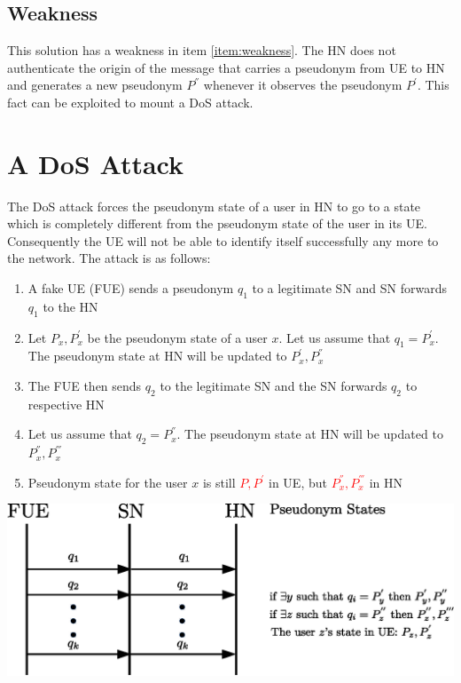 \documentclass[portrait,a0]{a0poster}
\begin{document}
\begin{multicols}{2}
\subsection*{Weakness}This solution has a weakness in item \ref{item:weakness}. The HN does not authenticate the origin of the message that carries a pseudonym from UE to HN and generates a new pseudonym $P^{''}$ whenever it observes the pseudonym $P^{'}$. This fact can be exploited to mount a DoS attack.

\section{A D\MakeLowercase{o}S Attack}
The DoS attack forces the pseudonym state of a user in HN to go to a state which is completely different from the pseudonym state of the user in its UE. Consequently the UE will not be able to identify itself successfully any more to the network. The attack is as follows:
\begin{enumerate}
\item \label{send_fake_pseudonym} A fake UE (FUE) sends a pseudonym $q_1$ to a legitimate SN and SN forwards $q_1$ to the HN
\item \label{q_equal_pseudonym} Let $P_x,P_x^{'}$ be the pseudonym state of a user $x$. Let us assume that $q_1=P_x^{'}$. The pseudonym state at HN will be updated to $P_x^{'},P_x^{''}$
\item The FUE then sends $q_2$ to the legitimate SN and the SN forwards $q_2$ to respective HN
\item Let us assume that $q_2=P_x^{''}$. The pseudonym state at HN will be updated to $P_x^{''},P_x^{'''}$
\item Pseudonym state for the user $x$ is still \textcolor{red}{$P,P^{'}$} in UE, but \textcolor{red}{$P_x^{''},P_x^{'''}$} in HN
\end{enumerate}

\begin{center}
\begin{minipage}[t]{0.9\linewidth} %
\vspace{.25cm} %
\includegraphics[width=1\linewidth]{attack.eps}
\hspace{0pt}
\vspace{.25cm} %
\end{minipage} 
\end{center}


\end{multicols}
\end{document}
